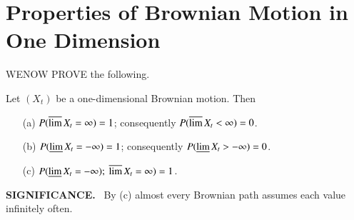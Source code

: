 \chapter{Properties of Brownian Motion in One Dimension}\label{chap9}

WE\pageoriginale NOW PROVE the following.

\begin{lemma*}
Let $(X_{t})$ be a one-dimensional Brownian motion. Then
\begin{itemize}
\item[\rm(a)] $P(\varlimsup X_{t}=\infty)=1$; consequently
  $P(\varlimsup X_{t}<\infty)=0$.

\item[\rm(b)] $P(\varliminf X_{t}=-\infty)=1$; consequently
  $P(\varliminf X_{t}>-\infty)=0$. 

\item[\rm(c)] $P(\varliminf X_{t}=-\infty);\ \varlimsup X_{t}=\infty)=1$.
\end{itemize}
\end{lemma*}

\medskip
\noindent
{\bf SIGNIFICANCE.}~ By (c) almost every Brownian path assumes each
value infinitely often.

